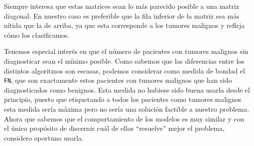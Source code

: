 \documentclass[a4]{article}
\begin{document}
\begin{figure}[H]
  \centering
\end{figure}

\vspace{-7mm}
Siempre interesa que estas matrices sean lo más parecido posible a una matriz diagonal. En nuestro caso es preferible que la fila inferior de la matriz sea más nítida que la de arriba, ya que esta corresponde a los tumores malignos y refleja cómo los clasificamos. 

Tenemos especial interés en que el número de pacientes con tumores malignos sin diagnosticar sean el mínimo posible. Como sabemos que las diferencias entre los distintos algoritmos son escasas, podemos considerar como medida de bondad el \texttt{FN}, que son exactamente estos pacientes con tumores malignos que han sido diagnosticados como benignos. Esta medida no hubiese sido buena usarla desde el principio, puesto que etiquetando a todos los pacientes como tumores malignos esta medida sería máxima pero no sería una solución factible a nuestro problema. Ahora que sabemos que el comportamiento de los modelos es muy similar y con el único propósito de discernir cuál de ellos ``resuelve'' mejor el problema, considero oportuno usarla.
\end{document}
